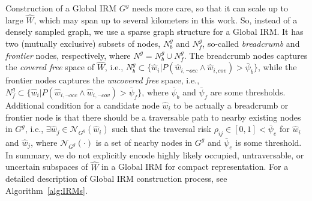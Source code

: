 \documentclass[letterpaper]{article} %
\newcommand{\phdone}[1]{} %
\begin{document}
\phdone{Global IRM}
Construction of a Global IRM $G^g$ needs more care, so that it can scale up to large $\hat{W}$, which may span up to several kilometers in this work.
So, instead of a densely sampled graph, we use a sparse graph structure for a Global IRM.
%
It has two (mutually exclusive) subsets of nodes, $N^g_b$ and $N^g_f$, so-called \textit{breadcrumb} and \textit{frontier} nodes, respectively, where $N^g = N^g_b \cup N^g_f$.
%
The breadcrumb nodes captures the \textit{covered free} space of $\hat{W}$, i.e., $N^g_b \subset \{\hat{w}_i | P(\hat{w}_{i,\neg occ} \wedge \hat{w}_{i,cov}) > \bar{\psi}_b\}$, while
the frontier nodes captures the \textit{uncovered free} space, i.e., $N^g_f \subset \{\hat{w}_i | P(\hat{w}_{i,\neg occ} \wedge \hat{w}_{i,\neg cov}) > \bar{\psi}_f\}$,
where $\bar{\psi}_b$ and $\bar{\psi}_f$ are some thresholds.
%
Additional condition for a candidate node $\hat{w}_i$ to be actually a breadcrumb or frontier node is that there should be a traversable path to nearby existing nodes in $G^g$, i.e., $\exists \hat{w}_j \in \mathcal{N}_{G^g}(\hat{w}_i)$ such that the traversal risk $\rho_{ij} \in [0, 1] < \bar{\psi}_e$ for $\hat{w}_i$ and $\hat{w}_j$, where $\mathcal{N}_{G^g}(\cdot)$ is a set of nearby nodes in $G^g$ and $\bar{\psi}_e$ is some threshold.
%
In summary, we do not explicitly encode highly likely occupied, untraversable, or uncertain subspaces of $\hat{W}$ in a Global IRM for compact representation.
%
For a detailed description of Global IRM construction process, see Algorithm~\ref{alg:IRMs}.
\end{document}
